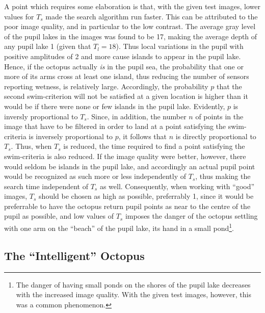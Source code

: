A point which requires some elaboration is that, with the given test
images, lower values for $T_{s}$ made the search algorithm run faster.
This can be attributed to the poor image quality, and in particular to
the low contrast.  The average gray level of the pupil lakes in the
images was found to be 17, making the average depth of any pupil lake
1 (given that $T_{l}=18$).  Thus local variations in the pupil with
positive amplitudes of 2 and more cause islands to appear in the pupil
lake.  Hence, if the octopus actually {\em is\/} in the pupil sea, the
probability that one or more of its arms cross at least one island,
thus reducing the number of sensors reporting wetness, is relatively
large.  Accordingly, the probability $p$ that the second
swim-criterion will not be satisfied at a given location is higher
than it would be if there were none or few islands in the pupil lake.
Evidently, $p$ is inversly proportional to $T_{s}$.  Since, in
addition, the number $n$ of points in the image that have to be
filtered in order to land at a point satisfying the swim-criteria is
inversely proportional to $p$, it follows that $n$ is directly
proportional to $T_{s}$.  Thus, when $T_{s}$ is reduced, the time
required to find a point satisfying the swim-criteria is also reduced.
If the image quality were better, however, there would seldom be
islands in the pupil lake, and accordingly an actual pupil point would
be recognized as such more or less independently of $T_{s}$, thus
making the search time independent of $T_{s}$ as well.  Consequently,
when working with ``good'' images, $T_{s}$ should be chosen as high as
possible, preferrably 1, since it would be preferrable to have the
octopus return pupil points as near to the centre of the pupil as
possible, and low values of $T_{s}$ imposes the danger of the octopus
settling with one arm on the ``beach'' of the pupil lake, its hand in
a small pond\footnote{The danger of having small ponds on the shores
  of the pupil lake decreases with the increased image quality.  With
  the given test images, however, this was a common phenomenon.}.

\subsection{The ``Intelligent'' Octopus}
\label{algo:seek:IQ}

